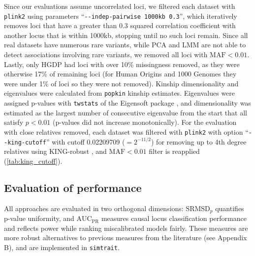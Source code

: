 \documentclass[11pt]{article}
\newcommand{\rmsd}{\text{SRMSD}_p}
\newcommand{\auc}{\text{AUC}_\text{PR}}
\begin{document}
\begin{linenumbers}
Since our evaluations assume uncorrelated loci, we filtered each dataset with \texttt{plink2} using parameters ``\texttt{-{}-indep-pairwise 1000kb 0.3}'', which iteratively removes loci that have a greater than 0.3 squared correlation coefficient with another locus that is within 1000kb, stopping until no such loci remain.
Since all real datasets have numerous rare variants, while PCA and LMM are not able to detect associations involving rare variants, we removed all loci with $\text{MAF} < 0.01$.
Lastly, only HGDP had loci with over 10\% missingness removed, as they were otherwise 17\% of remaining loci (for Human Origins and 1000 Genomes they were under 1\% of loci so they were not removed).
Kinship dimensionality and eigenvalues were calculated from \texttt{popkin} kinship estimates.
Eigenvalues were assigned p-values with \texttt{twstats} of the Eigensoft package \citep{patterson_population_2006}, and dimensionality was estimated as the largest number of consecutive eigenvalue from the start that all satisfy $p < 0.01$ (p-values did not increase monotonically).
For the evaluation with close relatives removed, each dataset was filtered with \texttt{plink2} with option ``\texttt{-{}-king-cutoff}'' with cutoff 0.02209709 ($= 2^{-11/2}$) for removing up to 4th degree relatives using KING-robust \citep{manichaikul_robust_2010}, and $\text{MAF} < 0.01$ filter is reapplied (\cref{tab:king_cutoff}).

\subsection{Evaluation of performance}

All approaches are evaluated in two orthogonal dimensions: $\rmsd$ quantifies p-value uniformity, and $\auc$ measures causal locus classification performance and reflects power while ranking miscalibrated models fairly.
These measures are more robust alternatives to previous measures from the literature (see Appendix B), and are implemented in \texttt{simtrait}.


\end{linenumbers}
\end{document}
